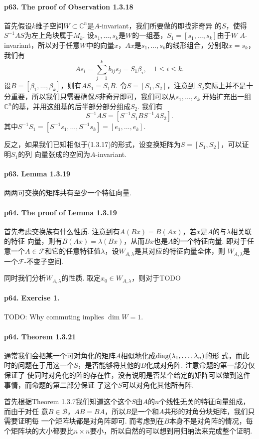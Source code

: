   \paragraph{p63. The proof of Observation 1.3.18}
    首先假设$k$维子空间$W\subset\mathbb{C}^n$是$A$-invariant，我们所要做的即找非奇异
    的$S$，使得$S^{-1}AS$为左上角块属于$M_k$. 设$s_1,\dots,s_k$是$W$的一组基，$S_1=
    [s_1,\dots,s_k]$由于$W$ $A$-invariant，所以对于任意$W$中的向量$x$，$Ax$是$s_1,
    \dots,s_k$的线形组合，分别取$x=s_k$，我们有
    \[
      As_i = \sum_{j=1}^k b_{ij}s_j = S_1\beta_i,\quad 1\le i \le k.
    \]
    设$B=[\beta_1,\dots,\beta_k]$，则有$AS_1 = S_1B$. 令$S=[S_1, S_2]$，注意到
    $S_2$实际上并不是十分重要，所以我们只需要确保$S$非奇异即可，我们可以从$s_1,\dots, s_k$
    开始扩充出一组$\mathbb{C}^n$的基，并用这组基的后半部分部分组成$S_2$. 我们有
    \[
      S^{-1}AS = [S^{-1}S_1B S^{-1}AS_2].
    \]
    其中$S^{-1}S_1 = [S^{-1}s_1,\dots,S^{-1}s_k] = [e_1,\dots,e_k]$.\par
    反之，如果我们已知相似于(1.3.17)的形式，设变换矩阵为$S=[S_1,S_2]$，可以证明$S_1$的列
    向量张成的空间为$A$-invariant. \par

  \paragraph{p63. Lemma 1.3.19}
    两两可交换的矩阵共有至少一个特征向量. 
  \paragraph{p64. The proof of Lemma 1.3.19}
    首先考虑交换族有什么性质. 注意到有$A(Bx)=B(Ax)$，若$x$是$A$的与$\lambda$相关联的特征
    向量，则有$B(Ax)=\lambda(Bx)$，从而$Bx$也是$A$的一个特征向量. 即对于任意一个$A\in
    \mathcal{F}$和它的任意特征值$\lambda$，设$W_{A,\lambda}$是其对应的特征向量全体，则
    $W_{A,\lambda}$是一个$\mathcal{F}$-不变子空间. \par
    同时我们分析$W_{A,\lambda}$的性质. 取定$x_0\in W_{A,\lambda}$，则对于TODO

  \paragraph{p64. Exercise 1.}
    TODO: Why commuting implies $\dim W=1$.
  \paragraph{p64. Theorem 1.3.21}
    通常我们会把某一个可对角化的矩阵$A$相似地化成$\operatorname{diag}(\lambda_1,\dots,\lambda_n)$的形
    式，而此时的问题在于用这一个$S$，是否能够将其他的$B$化成对角阵. 注意命题的第一部分仅保证了
    使同时对角化的阵的存在性，没有说明是否某个给定的矩阵可以做到这件事情，而命题的第二部分保证
    了这个$S$可以对角化其他所有阵. \par
    首先根据Theorem 1.3.7我们知道这个这个$S$由$A$的$n$个线性无关的特征向量组成，而由于对任
    意$B\in\mathcal{B}$，$AB=BA$，所以$B$是一个和$A$共形的对角分块矩阵，我们只需要证明每
    一个矩阵块都是对角阵即可. 而考虑到在$B$本身不是对角阵的情况，每个矩阵块的大小都要比$n
    \times n$要小，所以自然的可以想到用归纳法来完成整个证明. 


